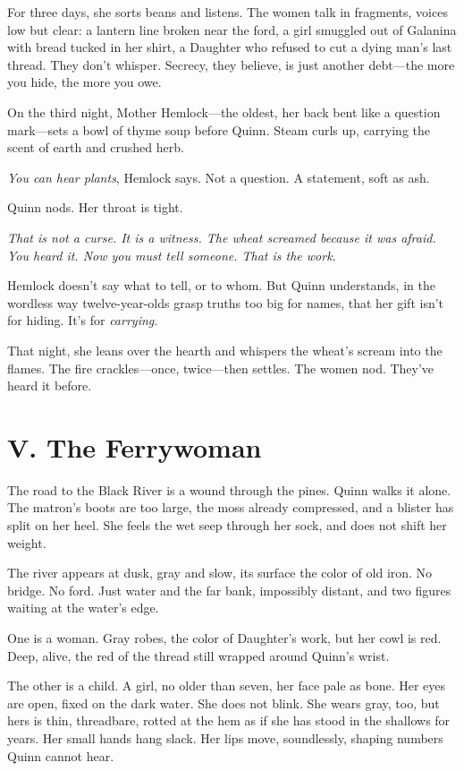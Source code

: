 \documentclass[11pt]{book}
\begin{document}
For three days, she sorts beans and listens. The women talk in fragments, voices low but clear: a lantern line broken near the ford, a girl smuggled out of Galanina with bread tucked in her shirt, a Daughter who refused to cut a dying man's last thread. They don't whisper. Secrecy, they believe, is just another debt---the more you hide, the more you owe.

On the third night, Mother Hemlock---the oldest, her back bent like a question mark---sets a bowl of thyme soup before Quinn. Steam curls up, carrying the scent of earth and crushed herb.

\textit{You can hear plants}, Hemlock says. Not a question. A statement, soft as ash.

Quinn nods. Her throat is tight.

\textit{That is not a curse. It is a witness. The wheat screamed because it was afraid. You heard it. Now you must tell someone. That is the work.}

Hemlock doesn't say what to tell, or to whom. But Quinn understands, in the wordless way twelve-year-olds grasp truths too big for names, that her gift isn't for hiding. It's for \textit{carrying}.

That night, she leans over the hearth and whispers the wheat's scream into the flames. The fire crackles---once, twice---then settles. The women nod. They've heard it before.

\section*{V. The Ferrywoman}

The road to the Black River is a wound through the pines. Quinn walks it alone. The matron's boots are too large, the moss already compressed, and a blister has split on her heel. She feels the wet seep through her sock, and does not shift her weight.

The river appears at dusk, gray and slow, its surface the color of old iron. No bridge. No ford. Just water and the far bank, impossibly distant, and two figures waiting at the water's edge.

One is a woman. Gray robes, the color of Daughter's work, but her cowl is red. Deep, alive, the red of the thread still wrapped around Quinn's wrist.

The other is a child. A girl, no older than seven, her face pale as bone. Her eyes are open, fixed on the dark water. She does not blink. She wears gray, too, but hers is thin, threadbare, rotted at the hem as if she has stood in the shallows for years. Her small hands hang slack. Her lips move, soundlessly, shaping numbers Quinn cannot hear.
\end{document}
